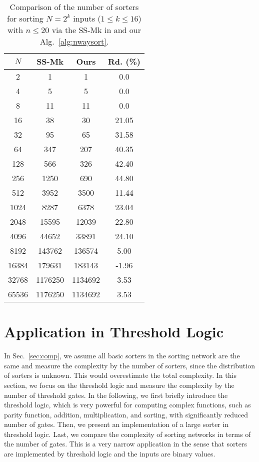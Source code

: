 \documentclass[10pt,journal,cspaper,compsoc]{IEEEtran}
\begin{document}
\begin{table}[!t]
\caption{Comparison of the number of sorters for sorting $N=2^k$ inputs ($1\le k \le 16$) with $n\le 20$ via the SS-Mk in \cite{gao1997sloping} and our Alg.~\ref{alg:nwaysort}.}\label{tab:complexity_n20}
\begin{center}
\begin{tabular}{|c|c|c|c|}
\hline
$N$ & SS-Mk & Ours & Rd. (\%)\\
\hline
2	&	1   &   1	&	0.0	\\
\hline
4	&	5   &   5	&	0.0	\\
\hline
8	&	11   &     11	&	0.0	\\
\hline
16	&	38  &   30	&	21.05\\
\hline
32	&	95  &   65	&	31.58\\
\hline
64	&	347    &   207	&	40.35\\
\hline
128	&	566   &   326	&	42.40\\
\hline
256	&	1250	&    690	&	44.80\\
\hline
512	&	3952   &   3500	&	11.44\\
\hline
1024	&	8287   &   6378	&	23.04	\\
\hline
2048	&	15595	&   12039	&	22.80 \\
\hline
4096	&	44652	&   33891	&	24.10 \\
\hline
8192	&	143762	&   136574	&	5.00\\
\hline
16384   &   179631  &   183143  &   -1.96 \\
\hline
32768   &   1176250 &   1134692 &   3.53 \\
\hline
65536   &   1176250 &   1134692 &   3.53 \\
\hline
\end{tabular}
\end{center}
\end{table}



\section{Application in Threshold Logic}
\label{sec:appl}
In Sec.~\ref{sec:comp}, we assume all basic sorters in the sorting network are the same and measure the complexity by the number of sorters, since the distribution of sorters is unknown. This would overestimate the total complexity.
In this section, we focus on the threshold logic and measure the complexity by the number of threshold gates.
In the following, we first briefly introduce the threshold logic, which is very powerful for computing complex functions, such as parity function, addition, multiplication, and sorting, with significantly reduced number of gates. Then, we present an implementation of a large sorter in threshold logic. Last, we compare the complexity of sorting networks in terms of the number of gates.
This is a very narrow application in the sense that sorters are implemented by threshold logic and the inputs are binary values.
\end{document}
